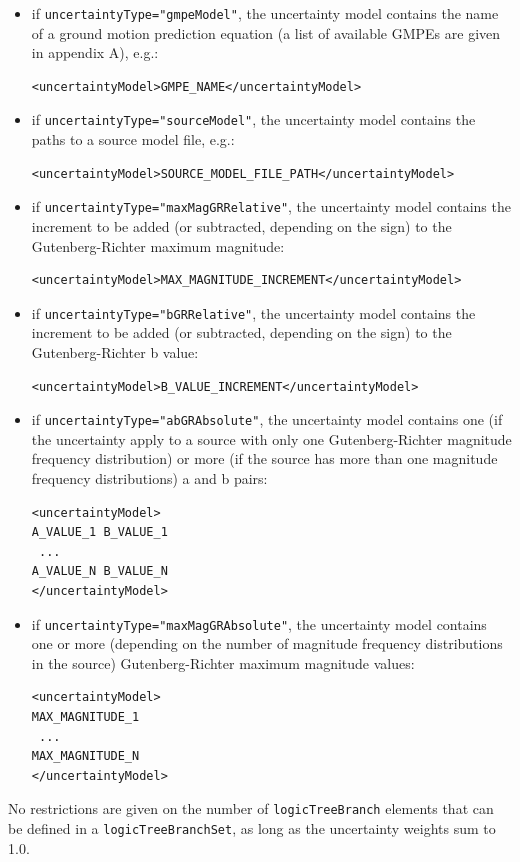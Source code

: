 \begin{itemize}
\item if \Verb+uncertaintyType="gmpeModel"+, the uncertainty model 
contains the name of a ground motion prediction equation (a list of 
available GMPEs are given in appendix A), e.g.:
\begin{Verbatim}[frame=single, commandchars=\\\{\}]
<uncertaintyModel>GMPE_NAME</uncertaintyModel>
\end{Verbatim}
\item if \Verb+uncertaintyType="sourceModel"+, the uncertainty model contains 
the paths to a source model file, e.g.:
\begin{Verbatim}[frame=single, commandchars=\\\{\}]
<uncertaintyModel>SOURCE_MODEL_FILE_PATH</uncertaintyModel>
\end{Verbatim}
\item if \Verb+uncertaintyType="maxMagGRRelative"+, the uncertainty model 
contains the increment to be added (or subtracted, depending on the sign) 
to the Guten\-berg-Richter maximum magnitude:
\begin{Verbatim}[frame=single, commandchars=\\\{\}, samepage=true]
<uncertaintyModel>MAX_MAGNITUDE_INCREMENT</uncertaintyModel>
\end{Verbatim}
\item if \Verb+uncertaintyType="bGRRelative"+, the uncertainty model 
contains the increment to be added (or subtracted, depending on the 
sign) to the Guten\-berg-Richter b value:
\begin{Verbatim}[frame=single, commandchars=\\\{\}, samepage=true]
<uncertaintyModel>B_VALUE_INCREMENT</uncertaintyModel>
\end{Verbatim}
\item if \Verb+uncertaintyType="abGRAbsolute"+, the uncertainty model 
contains one (if the uncertainty apply to a source with only one 
Guten\-berg-Richter magnitude frequency distribution) or more (if the 
source has more than one magnitude frequency distributions) a and b pairs:
\begin{Verbatim}[frame=single, commandchars=\\\{\}, samepage=true]
<uncertaintyModel>
A_VALUE_1 B_VALUE_1
 ... 
A_VALUE_N B_VALUE_N
</uncertaintyModel>
\end{Verbatim}
    \item if \Verb+uncertaintyType="maxMagGRAbsolute"+, the uncertainty 
    model contains one or more (depending on the number of magnitude 
    frequency distributions in the source) Guten\-berg-Richter maximum 
    magnitude values:
%
\begin{Verbatim}[frame=single, commandchars=\\\{\}, samepage=true]
<uncertaintyModel>
MAX_MAGNITUDE_1
 ... 
MAX_MAGNITUDE_N
</uncertaintyModel>
\end{Verbatim}
\end{itemize}
%
No restrictions are given on the number of \Verb+logicTreeBranch+ elements 
that can be defined in a \Verb+logicTreeBranchSet+, as long as the uncertainty 
weights sum to 1.0.

